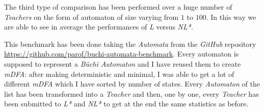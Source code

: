 The third type of comparison has been performed over a huge number of \textit{Teachers} on the form of automaton of size varying from $1$ to $100$. In this way we are able to see in average the performances of \textit{L} versus \textit{NL*}.

This benchmark has been done taking the \textit{Automata} from the \textit{GitHub} repository \url{https://github.com/parof/buchi-automata-benchmark}. Every automaton is supposed to represent a \textit{Büchi Automaton} and I have reused them to create \textit{mDFA}: after making deterministic and minimal, I was able to get a lot of different \textit{mDFA} which I have sorted by number of states. Every \textit{Automaton} of the list has been transformed into a \textit{Teacher} and then, one by one, every \textit{Teacher} has been submitted to \textit{L*} and \textit{NL*} to get at the end the same statistics as before.

